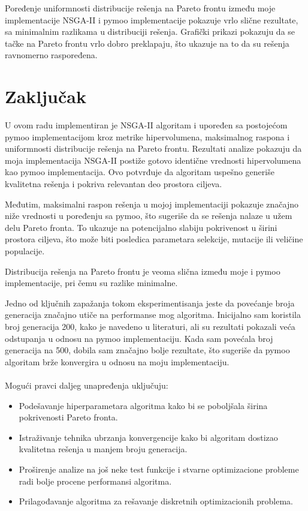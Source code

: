 \documentclass[12pt]{article}
\begin{document}
Poređenje uniformnosti distribucije rešenja na Pareto frontu između moje implementacije NSGA-II i pymoo implementacije pokazuje vrlo slične rezultate, sa minimalnim razlikama u distribuciji rešenja. Grafički prikazi pokazuju da se tačke na Pareto frontu vrlo dobro preklapaju, što ukazuje na to da su rešenja ravnomerno raspoređena.

\section{Zaključak}
U ovom radu implementiran je NSGA-II algoritam i upoređen sa postojećom pymoo implementacijom kroz metrike hipervolumena, maksimalnog raspona i uniformnosti distribucije rešenja na Pareto frontu.
Rezultati analize pokazuju da moja implementacija NSGA-II postiže gotovo identične vrednosti hipervolumena kao pymoo implementacija. Ovo potvrđuje da algoritam uspešno generiše kvalitetna rešenja i pokriva relevantan deo prostora ciljeva.

Međutim, maksimalni raspon rešenja u mojoj implementaciji pokazuje značajno niže vrednosti u poređenju sa pymoo, što sugeriše da se rešenja nalaze u užem delu Pareto fronta. To ukazuje na potencijalno slabiju pokrivenost u širini prostora ciljeva, što može biti posledica parametara selekcije, mutacije ili veličine populacije.

Distribucija rešenja na Pareto frontu je veoma slična između moje i pymoo implementacije, pri čemu su razlike minimalne.

Jedno od ključnih zapažanja tokom eksperimentisanja jeste da povećanje broja generacija značajno utiče na performanse mog algoritma. Inicijalno sam koristila broj generacija 200, kako je navedeno u literaturi, ali su rezultati pokazali veća odstupanja u odnosu na pymoo implementaciju. Kada sam povećala broj generacija na 500, dobila sam značajno bolje rezultate, što sugeriše da pymoo algoritam brže konvergira u odnosu na moju implementaciju.
\\
\\
Mogući pravci daljeg unapređenja uključuju:

\begin{itemize}
    \item Podešavanje hiperparametara algoritma kako bi se poboljšala širina pokrivenosti Pareto fronta.
    \item Istraživanje tehnika ubrzanja konvergencije kako bi algoritam dostizao kvalitetna rešenja u manjem broju generacija.
    \item Proširenje analize na još neke test funkcije i stvarne optimizacione probleme radi bolje procene performansi algoritma.
	\item Prilagođavanje algoritma za rešavanje diskretnih optimizacionih problema.
\end{itemize}
\end{document}
